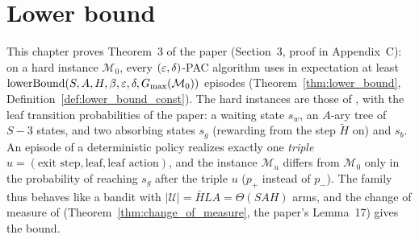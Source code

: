 \chapter{Lower bound}
\label{chap:lower_bound}

This chapter proves Theorem~3 of the paper (Section~3, proof in Appendix~C): on a hard
instance $\mathcal M_0$, every $(\varepsilon,\delta)$-PAC algorithm uses in expectation at least
$\mathrm{lowerBound}(S,A,H,\beta,\varepsilon,\delta,G_{\max}(\mathcal M_0))$ episodes
(Theorem~\ref{thm:lower_bound}, Definition~\ref{def:lower_bound_const}). The hard instances are
those of \cite{domingues2021episodic}, with the leaf transition probabilities of the paper: a
waiting state $s_w$, an $A$-ary tree of $S - 3$ states, and two absorbing states $s_g$
(rewarding from the step $\tilde H$ on) and $s_b$. An episode of a deterministic policy
realizes exactly one \emph{triple} $u = (\text{exit step}, \text{leaf}, \text{leaf action})$, and
the instance $\mathcal M_u$ differs from $\mathcal M_0$ only in the probability of reaching $s_g$
after the triple $u$ ($p_+$ instead of $p_-$). The family thus behaves like a bandit with
$|\mathcal U| = \bar H L A = \Theta(SAH)$ arms, and the change of measure of
\cite[Lemma~1]{kaufmann2016complexity} (Theorem~\ref{thm:change_of_measure}, the paper's
Lemma~17) gives the bound.

